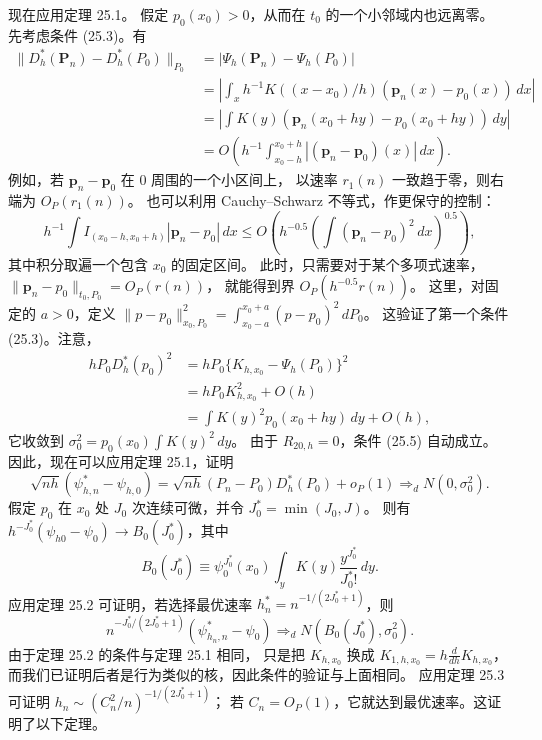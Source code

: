 现在应用定理 25.1。
假定 $p_0(x_0)>0$，从而在 $t_0$ 的一个小邻域内也远离零。
先考虑条件 (25.3)。有
\[
\begin{aligned}
 \|D_h^*(\mathbf P_n)-D_h^*(P_0)\|_{P_0}
 &=|\Psi_h(\mathbf P_n)-\Psi_h(P_0)|\\
 &=\left|\int_xh^{-1}K((x-x_0)/h)
 (\mathbf p_n(x)-p_0(x))\,dx\right|\\
 &=\left|\int K(y)
 (\mathbf p_n(x_0+hy)-p_0(x_0+hy))\,dy\right|\\
 &=O\left(h^{-1}\int_{x_0-h}^{x_0+h}
 |(\mathbf p_n-\mathbf p_0)(x)|\,dx\right).
\end{aligned}
\]
例如，若 $\mathbf p_n-\mathbf p_0$ 在 0 周围的一个小区间上，
以速率 $r_1(n)$ 一致趋于零，则右端为 $O_P(r_1(n))$。
也可以利用 Cauchy--Schwarz 不等式，作更保守的控制：
\[
 h^{-1}\int I_{(x_0-h,x_0+h)}|\mathbf p_n-p_0|\,dx
 \leq O\left(h^{-0.5}
 \left(\int(\mathbf p_n-p_0)^2\,dx\right)^{0.5}\right),
\]
其中积分取遍一个包含 $x_0$ 的固定区间。
此时，只需要对于某个多项式速率，
$\|\mathbf p_n-p_0\|_{t_0,P_0}=O_P(r(n))$，
就能得到界 $O_P(h^{-0.5}r(n))$。
这里，对固定的 $a>0$，定义
$\|p-p_0\|_{x_0,P_0}^2
=\int_{x_0-a}^{x_0+a}(p-p_0)^2\,dP_0$。
这验证了第一个条件 (25.3)。注意，
\[
\begin{aligned}
 hP_0D_h^*(p_0)^2
 &=hP_0\{K_{h,x_0}-\Psi_h(P_0)\}^2\\
 &=hP_0K_{h,x_0}^2+O(h)\\
 &=\int K(y)^2p_0(x_0+hy)\,dy+O(h),
\end{aligned}
\]
它收敛到 $\sigma_0^2=p_0(x_0)\int K(y)^2\,dy$。
由于 $R_{20,h}=0$，条件 (25.5) 自动成立。
因此，现在可以应用定理 25.1，证明
\[
 \sqrt{nh}(\psi^*_{h,n}-\psi_{h,0})
 =\sqrt{nh}(P_n-P_0)D_h^*(P_0)+o_P(1)
 \Rightarrow_dN(0,\sigma_0^2).
\]
假定 $p_0$ 在 $x_0$ 处 $J_0$ 次连续可微，并令 $J_0^*=\min(J_0,J)$。
则有 $h^{-J_0^*}(\psi_{h0}-\psi_0)\to B_0(J_0^*)$，其中
\begin{equation}
 B_0(J_0^*)\equiv
 \psi_0^{J_0^*}(x_0)\int_yK(y)\frac{y^{J_0^*}}{J_0^*!}\,dy.
\tag{25.12}
\end{equation}
应用定理 25.2 可证明，若选择最优速率
$h_n^*=n^{-1/(2J_0^*+1)}$，则
\[
 n^{-J_0^*/(2J_0^*+1)}
 (\psi^*_{h_n,n}-\psi_0)\Rightarrow_dN(B_0(J_0^*),\sigma_0^2).
\]
由于定理 25.2 的条件与定理 25.1 相同，
只是把 $K_{h,x_0}$ 换成
$K_{1,h,x_0}=h\frac{d}{dh}K_{h,x_0}$，
而我们已证明后者是行为类似的核，因此条件的验证与上面相同。
应用定理 25.3 可证明
$h_n\sim(C_n^2/n)^{-1/(2J_0^*+1)}$；
若 $C_n=O_P(1)$，它就达到最优速率。这证明了以下定理。

